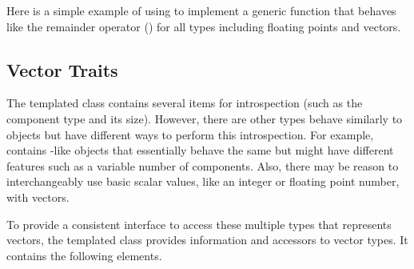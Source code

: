 Here is a simple example of using  to implement a generic
function that behaves like the remainder operator (\textcode{\%}) for all
types including floating points and vectors.





\subsection{Vector Traits}


The templated  class contains several items for introspection (such as the component type and its size).
However, there are other types behave similarly to  objects but have different ways to perform this introspection.
 For example, \VTKm contains -like objects that essentially behave the same but might have different features such as a variable number of components.
Also, there may be reason to interchangeably use basic scalar values, like an integer or floating point number, with vectors.

To provide a consistent interface to access these multiple types that represents vectors, the  templated class provides information and accessors to vector types.
It contains the following elements.


